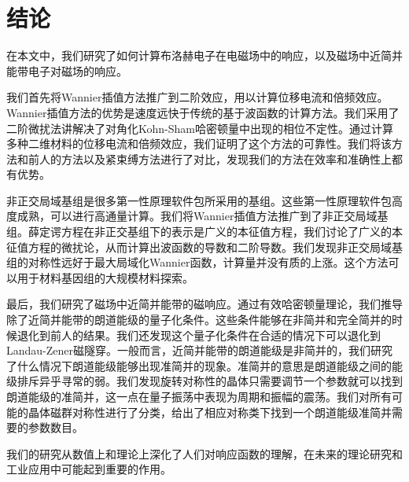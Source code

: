 \chapter{结论}

在本文中，我们研究了如何计算布洛赫电子在电磁场中的响应，以及磁场中近简并能带电子对磁场的响应。

我们首先将Wannier插值方法推广到二阶效应，用以计算位移电流和倍频效应。Wannier插值方法的优势是速度远快于传统的基于波函数的计算方法。我们采用了二阶微扰法讲解决了对角化Kohn-Sham哈密顿量中出现的相位不定性。通过计算多种二维材料的位移电流和倍频效应，我们证明了这个方法的可靠性。我们将该方法和前人的方法以及紧束缚方法进行了对比，发现我们的方法在效率和准确性上都有优势。

非正交局域基组是很多第一性原理软件包所采用的基组。这些第一性原理软件包高度成熟，可以进行高通量计算。我们将Wannier插值方法推广到了非正交局域基组。薛定谔方程在非正交基组下的表示是广义的本征值方程，我们讨论了广义的本征值方程的微扰论，从而计算出波函数的导数和二阶导数。我们发现非正交局域基组的对称性远好于最大局域化Wannier函数，计算量并没有质的上涨。这个方法可以用于材料基因组的大规模材料探索。

最后，我们研究了磁场中近简并能带的磁响应。通过有效哈密顿量理论，我们推导除了近简并能带的朗道能级的量子化条件。这些条件能够在非简并和完全简并的时候退化到前人的结果。我们还发现这个量子化条件在合适的情况下可以退化到Landau-Zener磁隧穿。一般而言，近简并能带的朗道能级是非简并的，我们研究了什么情况下朗道能级能够出现准简并的现象。准简并的意思是朗道能级之间的能级排斥异乎寻常的弱。我们发现旋转对称性的晶体只需要调节一个参数就可以找到朗道能级的准简并，这一点在量子振荡中表现为周期和振幅的震荡。我们对所有可能的晶体磁群对称性进行了分类，给出了相应对称类下找到一个朗道能级准简并需要的参数数目。

我们的研究从数值上和理论上深化了人们对响应函数的理解，在未来的理论研究和工业应用中可能起到重要的作用。